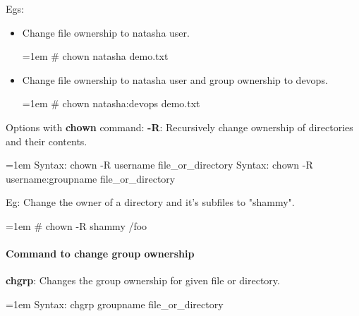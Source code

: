 \begin{flushleft}
Egs:
\begin{itemize}
	\item Change file ownership to natasha user.
	\begin{tcolorbox}[breakable,notitle,boxrule=-0pt,colback=black,colframe=black]
		\color{green}
		\font=1em
		\# chown natasha demo.txt
		\font=4pt
	\end{tcolorbox}	
	\bigskip

	\item Change file ownership to natasha user and group ownership to devops.
	\begin{tcolorbox}[breakable,notitle,boxrule=-0pt,colback=black,colframe=black]
		\color{green}
		\font=1em
		\# chown natasha:devops demo.txt
		\font=4pt
	\end{tcolorbox}
	\bigskip

\end{itemize}

Options with \textbf{chown} command:	
\newline
\textbf{-R}: Recursively change ownership of directories and their contents.
\begin{tcolorbox}[breakable,notitle,boxrule=0pt,colback=pink,colframe=pink]
	\color{black}
	\font=1em
	Syntax: chown -R username file\_or\_directory
	\newline
	Syntax: chown -R username:groupname file\_or\_directory
	\font=4pt
\end{tcolorbox}
\newline
Eg: Change the owner of a directory and it's subfiles to "shammy".
\begin{tcolorbox}[breakable,notitle,boxrule=-0pt,colback=black,colframe=black]
	\color{green}
	\font=1em
	\# chown -R shammy /foo
	\font=4pt
\end{tcolorbox}


\newpage

\paragraph{Command to change group ownership}
\bigskip
\textbf{chgrp}: Changes the group ownership for given file or directory.

\begin{tcolorbox}[breakable,notitle,boxrule=0pt,colback=pink,colframe=pink]
	\color{black}
	\font=1em
	Syntax: chgrp groupname file\_or\_directory
	\font=4pt
\end{tcolorbox}


\end{flushleft}
